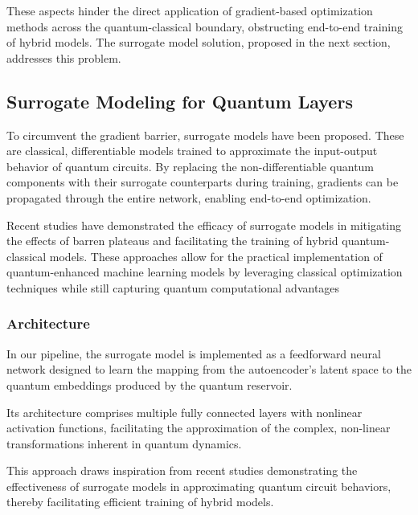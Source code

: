 \documentclass[conference]{IEEEtran}
\begin{document}
These aspects hinder the direct application of 
gradient-based optimization methods across the 
quantum-classical boundary, obstructing end-to-end 
training of hybrid models. The surrogate model 
solution, proposed in the next section, addresses 
this problem.

\subsection{Surrogate Modeling for Quantum Layers}
To circumvent the gradient barrier, surrogate models 
have been proposed. These are classical, differentiable 
models trained to approximate the input-output behavior 
of quantum circuits. By replacing the non-differentiable 
quantum components with their surrogate counterparts during 
training, gradients can be propagated through the entire network, 
enabling end-to-end optimization. 

Recent studies have demonstrated the efficacy of 
surrogate models in mitigating the effects of barren plateaus 
and facilitating the training of hybrid quantum-classical models. 
These approaches allow for the practical implementation of 
quantum-enhanced machine learning models by leveraging classical 
optimization techniques while still capturing quantum computational 
advantages~\cite{xieQuantumSurrogateDrivenImage2025b}


\subsubsection{Architecture}
In our pipeline, the surrogate model is implemented as a 
feedforward neural network designed to learn the mapping 
from the autoencoder's latent space to the quantum 
embeddings produced by the quantum reservoir. 

Its architecture comprises multiple fully connected 
layers with nonlinear activation functions, facilitating 
the approximation of the complex, non-linear 
transformations inherent in quantum dynamics.

This approach draws inspiration from recent studies 
demonstrating the effectiveness of surrogate models 
in approximating quantum circuit behaviors, thereby 
facilitating efficient training of hybrid 
models.~\cite{xieQuantumSurrogateDrivenImage2025b,schreiberClassicalSurrogatesQuantum2023}
\end{document}
